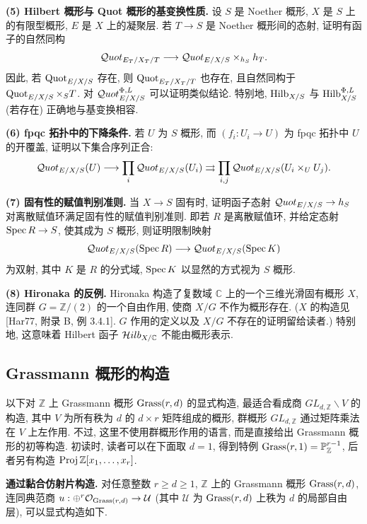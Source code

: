 \textbf{(5) Hilbert 概形与 Quot 概形的基变换性质.}
设 $S$ 是 Noether 概形, $X$ 是 $S$ 上的有限型概形, $E$ 是 $X$ 上的凝聚层. 若 $T\to S$ 是 Noether 概形间的态射, 证明有函子的自然同构
\[
 \mathcal{Q}uot_{E_T/X_T/T}\longrightarrow\mathcal{Q}uot_{E/X/S}\times_{h_S}h_T.
\]
因此, 若 $\operatorname{Quot}_{E/X/S}$ 存在, 则 $\operatorname{Quot}_{E_T/X_T/T}$ 也存在, 且自然同构于 $\operatorname{Quot}_{E/X/S}\times_S T$. 对 $\mathcal{Q}uot^{\Phi,L}_{E/X/S}$ 可以证明类似结论. 特别地, $\operatorname{Hilb}_{X/S}$ 与 $\operatorname{Hilb}^{\Phi,L}_{X/S}$ (若存在) 正确地与基变换相容.

\textbf{(6) fpqc 拓扑中的下降条件.}
若 $U$ 为 $S$ 概形, 而 $(f_i:U_i\to U)$ 为 fpqc 拓扑中 $U$ 的开覆盖, 证明以下集合序列正合:
\[
 \mathcal{Q}uot_{E/X/S}(U)\longrightarrow\prod_i\mathcal{Q}uot_{E/X/S}(U_i)
 \rightrightarrows\prod_{i,j}\mathcal{Q}uot_{E/X/S}(U_i\times_U U_j).
\]

\textbf{(7) 固有性的赋值判别准则.}
当 $X\to S$ 固有时, 证明函子态射 $\mathcal{Q}uot_{E/X/S}\to h_S$ 对离散赋值环满足固有性的赋值判别准则. 即若 $R$ 是离散赋值环, 并给定态射 $\operatorname{Spec} R\to S$, 使其成为 $S$ 概形, 则证明限制映射
\[
 \mathcal{Q}uot_{E/X/S}(\operatorname{Spec} R)\longrightarrow\mathcal{Q}uot_{E/X/S}(\operatorname{Spec} K)
\]
为双射, 其中 $K$ 是 $R$ 的分式域, $\operatorname{Spec} K$ 以显然的方式视为 $S$ 概形.

\textbf{(8) Hironaka 的反例.}
Hironaka 构造了复数域 $\mathbb C$ 上的一个三维光滑固有概形 $X$, 连同群 $G=\mathbb Z/(2)$ 的一个自由作用, 使商 $X/G$ 不作为概形存在. ($X$ 的构造见 [Har77, 附录 B, 例 3.4.1]. $G$ 作用的定义以及 $X/G$ 不存在的证明留给读者.) 特别地, 这意味着 Hilbert 函子 $\mathcal{H}ilb_{X/\mathbb C}$ 不能由概形表示.

\subsection{Grassmann 概形的构造}\label{ch05:sec5.1.6}
以下对 $\mathbb Z$ 上 Grassmann 概形 $\operatorname{Grass}(r,d)$ 的显式构造, 最适合看成商 $GL_{d,\mathbb Z}\backslash V$ 的构造, 其中 $V$ 为所有秩为 $d$ 的 $d\times r$ 矩阵组成的概形, 群概形 $GL_{d,\mathbb Z}$ 通过矩阵乘法在 $V$ 上左作用. 不过, 这里不使用群概形作用的语言, 而是直接给出 Grassmann 概形的初等构造.
初读时, 读者可以在下面取 $d=1$, 得到特例 $\operatorname{Grass}(r,1)=\mathbb P^{r-1}_{\mathbb Z}$, 后者另有构造 $\operatorname{Proj}\mathbb Z[x_1,\ldots,x_r]$.

\textbf{通过黏合仿射片构造.}
对任意整数 $r\geq d\geq1$, $\mathbb Z$ 上的 Grassmann 概形 $\operatorname{Grass}(r,d)$, 连同典范商 $u:\oplus^r\mathcal O_{\operatorname{Grass}(r,d)}\to\mathcal U$ (其中 $\mathcal U$ 为 $\operatorname{Grass}(r,d)$ 上秩为 $d$ 的局部自由层), 可以显式构造如下.

